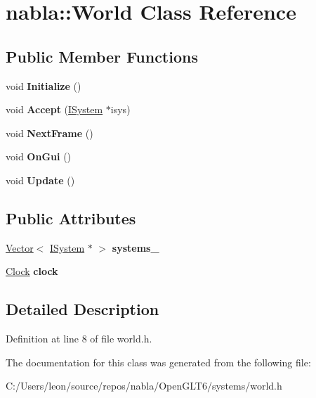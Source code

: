\hypertarget{classnabla_1_1_world}{}\section{nabla\+::World Class Reference}
\label{classnabla_1_1_world}
\subsection*{Public Member Functions}
\begin{DoxyCompactItemize}
\item 
\mbox{\label{classnabla_1_1_world_afd86de28b24200e113d000b079ab3580}} 
void {\bfseries Initialize} ()
\item 
\mbox{\label{classnabla_1_1_world_a83a8da96c70c9441263cbcbb4a7b60cc}} 
void {\bfseries Accept} (\mbox{\hyperlink{classnabla_1_1_i_system}{I\+System}} $\ast$isys)
\item 
\mbox{\label{classnabla_1_1_world_ac85ea7311f844799d2da2bc0ead85fac}} 
void {\bfseries Next\+Frame} ()
\item 
\mbox{\label{classnabla_1_1_world_ae3d220e087a11bb3927b0a821f7b454e}} 
void {\bfseries On\+Gui} ()
\item 
\mbox{\label{classnabla_1_1_world_a50c39aa39cf0632eef088402a04397b3}} 
void {\bfseries Update} ()
\end{DoxyCompactItemize}
\subsection*{Public Attributes}
\begin{DoxyCompactItemize}
\item 
\mbox{\label{classnabla_1_1_world_a2b72daaf403edee1ee2bf8ee3ea68a50}} 
\mbox{\hyperlink{classnabla_1_1_s_t_l_vector_ex}{Vector}}$<$ \mbox{\hyperlink{classnabla_1_1_i_system}{I\+System}} $\ast$ $>$ {\bfseries systems\+\_\+}
\item 
\mbox{\label{classnabla_1_1_world_aff8256f2d789665022ce7cdf04f1bd36}} 
\mbox{\hyperlink{classnabla_1_1_clock}{Clock}} {\bfseries clock}
\end{DoxyCompactItemize}


\subsection{Detailed Description}


Definition at line 8 of file world.\+h.



The documentation for this class was generated from the following file\+:\begin{DoxyCompactItemize}
\item 
C\+:/\+Users/leon/source/repos/nabla/\+Open\+G\+L\+T6/systems/world.\+h\end{DoxyCompactItemize}
